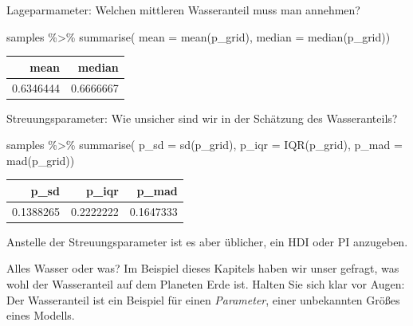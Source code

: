 \documentclass[
  a4paper,
  DIV=11]{scrreprt}
\newenvironment{Shaded}{\begin{snugshade}}{\end{snugshade}}
\newcommand{\AttributeTok}[1]{\textcolor[rgb]{0.40,0.45,0.13}{#1}}
\newcommand{\FunctionTok}[1]{\textcolor[rgb]{0.28,0.35,0.67}{#1}}
\newcommand{\NormalTok}[1]{\textcolor[rgb]{0.00,0.23,0.31}{#1}}
\newcommand{\SpecialCharTok}[1]{\textcolor[rgb]{0.37,0.37,0.37}{#1}}
\theoremstyle{definition}
\theoremstyle{remark}
\begin{document}
Lageparmameter: Welchen mittleren Wasseranteil muss man annehmen?

\begin{Shaded}
\begin{Highlighting}[]
\NormalTok{samples }\SpecialCharTok{\%\textgreater{}\%} 
  \FunctionTok{summarise}\NormalTok{(}
    \AttributeTok{mean   =} \FunctionTok{mean}\NormalTok{(p\_grid),}
    \AttributeTok{median =} \FunctionTok{median}\NormalTok{(p\_grid))  }
\end{Highlighting}
\end{Shaded}

\begin{longtable}[]{@{}rr@{}}
\toprule()
mean & median \\
\midrule()
\endhead
0.6346444 & 0.6666667 \\
\bottomrule()
\end{longtable}

Streuungsparameter: Wie unsicher sind wir in der Schätzung des
Wasseranteils?

\begin{Shaded}
\begin{Highlighting}[]
\NormalTok{samples }\SpecialCharTok{\%\textgreater{}\%} 
  \FunctionTok{summarise}\NormalTok{(}
    \AttributeTok{p\_sd   =} \FunctionTok{sd}\NormalTok{(p\_grid),}
    \AttributeTok{p\_iqr =} \FunctionTok{IQR}\NormalTok{(p\_grid),}
    \AttributeTok{p\_mad =} \FunctionTok{mad}\NormalTok{(p\_grid))  }
\end{Highlighting}
\end{Shaded}

\begin{longtable}[]{@{}rrr@{}}
\toprule()
p\_sd & p\_iqr & p\_mad \\
\midrule()
\endhead
0.1388265 & 0.2222222 & 0.1647333 \\
\bottomrule()
\end{longtable}

Anstelle der Streuungsparameter ist es aber üblicher, ein HDI oder PI
anzugeben.

\begin{tcolorbox}[enhanced jigsaw, leftrule=.75mm, left=2mm, bottomrule=.15mm, opacityback=0, coltitle=black, colbacktitle=quarto-callout-important-color!10!white, opacitybacktitle=0.6, rightrule=.15mm, toptitle=1mm, colback=white, colframe=quarto-callout-important-color-frame, arc=.35mm, toprule=.15mm, breakable, titlerule=0mm, bottomtitle=1mm, title=\textcolor{quarto-callout-important-color}{\faExclamation}\hspace{0.5em}{Wichtig}]
Alles Wasser oder was? Im Beispiel dieses Kapitels haben wir unser
gefragt, was wohl der Wasseranteil auf dem Planeten Erde ist. Halten Sie
sich klar vor Augen: Der Wasseranteil ist ein Beispiel für einen
\emph{Parameter}, einer unbekannten Größes eines Modells.
\end{tcolorbox}
\end{document}
